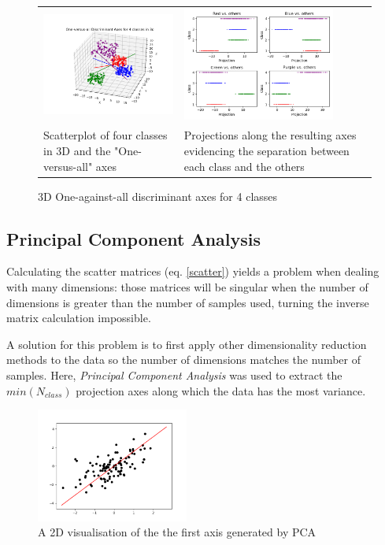 \documentclass{bmvc2k}
\begin{document}
\begin{figure}[H]
   \begin{center}
      \begin{tabular}{p{5cm} p{5cm}}
         \includegraphics[width=5cm]{figures/3ddiscriminantAxes.png}&\includegraphics[width=5cm]{figures/3dProjections.png}\\
         Scatterplot of four classes in 3D and the "One-versus-all" axes&Projections along the resulting axes evidencing the separation between each class and the others
      \end{tabular}
   \end{center}
   \caption{3D One-against-all discriminant axes for 4 classes}
\end{figure}

\subsection{Principal Component Analysis}

Calculating the scatter matrices (eq. \ref{scatter}) yields a problem when dealing with many dimensions: those matrices will be singular when the number of dimensions is greater than the number of samples used, turning the inverse matrix calculation impossible\cite{singular}.

A solution for this problem is to first apply other dimensionality reduction methods to the data so the number of dimensions matches the number of samples\cite{face}. Here, \textit{Principal Component Analysis} was used to extract the $min(N_{class})$ projection axes along which the data has the most variance.

\begin{figure}[H]
   \begin{center}
         \includegraphics[width=5cm]{figures/PCA.png}
   \end{center}
   \caption{A 2D visualisation of the the first axis generated by PCA}
\end{figure}
\end{document}
